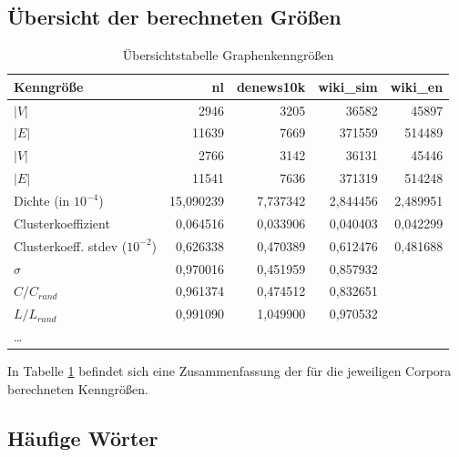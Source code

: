 \documentclass[11pt, a4paper]{article}
\begin{document}

\subsection{Übersicht der berechneten Größen}
\begin{table}[ht]
    \begin{tabular}{l*{4}{r}}
    \toprule
    Kenngröße                     & nl        & denews10k & wiki\_sim & wiki\_en \\
    \midrule
    $|V|$                         & 2946      & 3205      & 36582     & 45897  \\
    $|E|$                         & 11639     & 7669      & 371559    & 514489 \\
    $|V|$\footnotemark[6]         & 2766      & 3142      & 36131     & 45446  \\
    $|E|$\footnotemark[6]         & 11541     & 7636      & 371319    & 514248 \\
    Dichte (in $10^{-4}$)          & 15,090239 & 7,737342  & 2,844456  & 2,489951 \\
    Clusterkoeffizient            & 0,064516  & 0,033906  & 0,040403  & 0,042299 \\
    Clusterkoeff. stdev ($10^{-2}$)           & 0,626338  & 0,470389  & 0,612476  & 0,481688 \\
    $\sigma$                      & 0,970016  & 0,451959  & 0,857932  &         \\
    $C / C_{rand}$                 & 0,961374  & 0,474512  & 0,832651  &         \\
    $L / L_{rand}$                 & 0,991090  & 1,049900  & 0,970532  &         \\
    \dots                         &           &           &           &          \\
    \bottomrule
    \end{tabular}
    \caption{Übersichtstabelle Graphenkenngrößen}
    \label{tab-zsf}
\end{table}

In Tabelle \ref{tab-zsf} befindet sich eine Zusammenfassung der für die
jeweiligen Corpora berechneten Kenngrößen.


\subsection{H\"aufige W\"orter}
\end{document}

